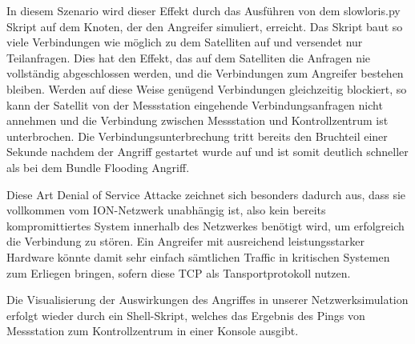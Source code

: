\documentclass{article}
\begin{document}
In diesem Szenario wird dieser Effekt durch das Ausführen von dem slowloris.py Skript auf dem Knoten, der den Angreifer simuliert, erreicht. Das Skript baut so viele Verbindungen wie möglich zu dem Satelliten auf und versendet nur Teilanfragen. Dies hat den Effekt, das auf dem Satelliten die Anfragen nie vollständig abgeschlossen werden, und die Verbindungen zum Angreifer bestehen bleiben. Werden auf diese Weise genügend Verbindungen gleichzeitig blockiert, so kann der Satellit von der  Messstation eingehende Verbindungsanfragen nicht annehmen und die Verbindung zwischen Messstation und Kontrollzentrum ist unterbrochen. Die Verbindungsunterbrechung tritt bereits den Bruchteil einer Sekunde nachdem der Angriff gestartet wurde auf und ist somit deutlich schneller als bei dem Bundle Flooding Angriff.\par
Diese Art Denial of Service Attacke zeichnet sich besonders dadurch aus, dass sie vollkommen vom ION-Netzwerk unabhängig ist, also kein bereits kompromittiertes System innerhalb des Netzwerkes benötigt wird, um erfolgreich die Verbindung zu stören. Ein Angreifer mit ausreichend leistungsstarker Hardware könnte damit sehr einfach sämtlichen Traffic in kritischen Systemen zum Erliegen bringen, sofern diese TCP als Tansportprotokoll nutzen.\par
Die Visualisierung der Auswirkungen des Angriffes in unserer Netzwerksimulation erfolgt wieder durch ein Shell-Skript, welches das Ergebnis des Pings von Messstation zum Kontrollzentrum in einer Konsole ausgibt.
\end{document}
